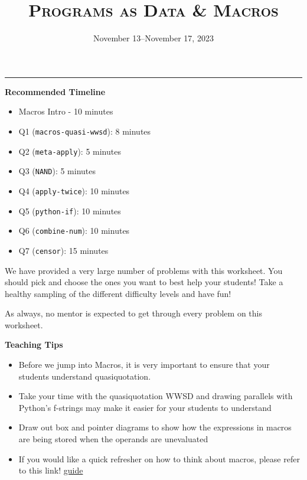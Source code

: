 \documentclass{exam}
\title{\textsc{Programs as Data \& Macros}}
\date{November 13--November 17, 2023}
\begin{document}
\maketitle
\rule{\textwidth}{0.15em}

\begin{meta}
\begin{blocksection}
    \textbf{Recommended Timeline}
    \begin{itemize}
        \item Macros Intro - 10 minutes
        \item Q1 (\lstinline{macros-quasi-wwsd}): 8 minutes
        \item Q2 (\lstinline{meta-apply}): 5 minutes
        \item Q3 (\lstinline{NAND}): 5 minutes
        \item Q4 (\lstinline{apply-twice}): 10 minutes
        \item Q5 (\lstinline{python-if}): 10 minutes
        \item Q6 (\lstinline{combine-num}): 10 minutes
        \item Q7 (\lstinline{censor}): 15 minutes 
    \end{itemize}
\end{blocksection}
\end{meta}
We have provided a very large number of problems with this worksheet. You should pick and choose the ones you want to best help your students! Take a healthy sampling of the different difficulty levels and have fun!

As always, no mentor is expected to get through every problem on this worksheet. 
\begin{meta}
\textbf{Teaching Tips}
\begin{itemize}
    \item Before we jump into Macros, it is very important to ensure that your students understand quasiquotation.
    \item Take your time with the quasiquotation WWSD and drawing parallels with Python's f-strings may make it easier for your students to understand 
    \item Draw out box and pointer diagrams to show how the expressions in macros are being stored when the operands are unevaluated
    \item If you would like a quick refresher on how to think about macros, please refer to this link! \href{https://docs.google.com/document/d/1JSbvtJ5bYUEhovDZd_gQnBvkG_WDcafmX-4B3QeIXZU/edit}{guide}
\end{itemize}
\end{meta}
\end{document}
